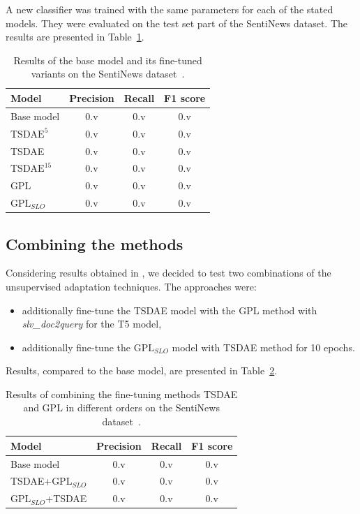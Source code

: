 \documentclass[fleqn,moreauthors,10pt]{ds_report}
\begin{document}
A new classifier was trained with the same parameters for each of the stated models. They were evaluated on the test set part of the SentiNews dataset. The results are presented in Table~\ref{tab2}.

\begin{table}[!h]
	\footnotesize
	\begin{center}
		\begin{tabular}{ |l|c|c|c| }
		\hline
		\rowcolor{Blue}Model & Precision & Recall & F1 score\\
		\hline

		Base model & 0.v & 0.v & 0.v\\
		\hline
		$\text{TSDAE}^{5}$ & 0.v & 0.v & 0.v\\
		TSDAE & 0.v & 0.v & 0.v\\
		$\text{TSDAE}^{15}$ & 0.v & 0.v & 0.v\\
		\hline
		GPL & 0.v & 0.v & 0.v\\
		$\text{GPL}_{SLO}$ & 0.v & 0.v & 0.v\\

		\hline
		\end{tabular}
	\end{center}
\caption{Results of the base model and its fine-tuned variants on the SentiNews dataset~\cite{sentiNews}.}
\label{tab2}
\end{table}



\subsection*{Combining the methods}
Considering results obtained in \cite{GPL}, we decided to test two combinations of the unsupervised adaptation techniques. The approaches were:
\begin{itemize}
	\item additionally fine-tune the TSDAE model with the GPL method with {\it slv\_doc2query} for the T5 model,
	\item additionally fine-tune the $\text{GPL}_{SLO}$ model with TSDAE method for 10 epochs.
\end{itemize}
Results, compared to the base model, are presented in Table~\ref{tab3}.

\begin{table}[!h]
	\footnotesize
	\begin{center}
		\begin{tabular}{ |l|c|c|c| }
		\hline
		\rowcolor{Blue}Model & Precision & Recall & F1 score\\
		\hline

		Base model & 0.v & 0.v & 0.v\\
		TSDAE+$\text{GPL}_{SLO}$ & 0.v & 0.v & 0.v\\
		$\text{GPL}_{SLO}$+TSDAE & 0.v & 0.v & 0.v\\

		\hline
		\end{tabular}
	\end{center}
\caption{Results of combining the fine-tuning methods TSDAE and GPL in different orders on the SentiNews dataset~\cite{sentiNews}.}
\label{tab3}
\end{table}
\end{document}
